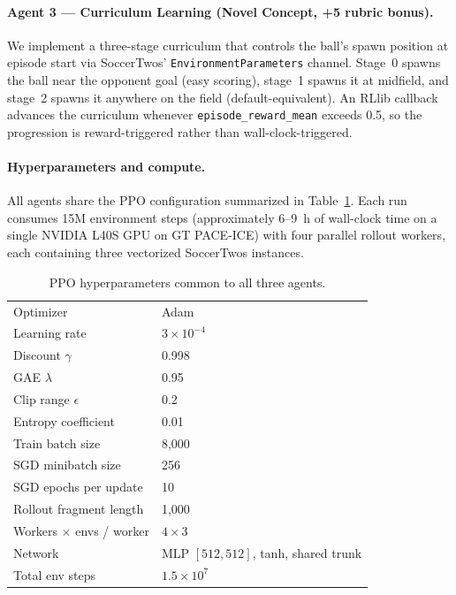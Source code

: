 \documentclass{article}
\begin{document}
\paragraph{Agent 3 --- Curriculum Learning (Novel Concept, +5 rubric bonus).}
We implement a three-stage curriculum that controls the ball's spawn position at episode start via SoccerTwos' \texttt{EnvironmentParameters} channel. Stage~0 spawns the ball near the opponent goal (easy scoring), stage~1 spawns it at midfield, and stage~2 spawns it anywhere on the field (default-equivalent). An RLlib callback advances the curriculum whenever \texttt{episode\_reward\_mean} exceeds 0.5, so the progression is reward-triggered rather than wall-clock-triggered.

\paragraph{Hyperparameters and compute.}
All agents share the PPO configuration summarized in Table~\ref{tab:hparams}.
Each run consumes 15M environment steps (approximately 6--9~h of wall-clock time on a single NVIDIA L40S GPU on GT PACE-ICE) with four parallel rollout workers, each containing three vectorized SoccerTwos instances.

\begin{table}[h]
\centering
\small
\begin{tabular}{ll}
\toprule
Optimizer & Adam \\
Learning rate & $3\times 10^{-4}$ \\
Discount $\gamma$ & 0.998 \\
GAE $\lambda$ & 0.95 \\
Clip range $\epsilon$ & 0.2 \\
Entropy coefficient & 0.01 \\
Train batch size & 8{,}000 \\
SGD minibatch size & 256 \\
SGD epochs per update & 10 \\
Rollout fragment length & 1{,}000 \\
Workers $\times$ envs / worker & $4 \times 3$ \\
Network & MLP $[512, 512]$, tanh, shared trunk \\
Total env steps & $1.5\times 10^{7}$ \\
\bottomrule
\end{tabular}
\caption{PPO hyperparameters common to all three agents.}
\label{tab:hparams}
\end{table}
\end{document}
